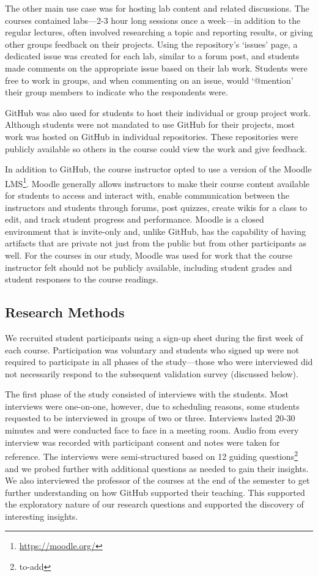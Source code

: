 The other main use case was for hosting lab content and related discussions. The courses contained labs---2-3 hour long sessions once a week---in addition to the regular lectures, often involved researching a topic and reporting results, or giving other groups feedback on their projects. Using the repository's `issues' page, a dedicated issue was created for each lab, similar to a forum post, and students made comments on the appropriate issue based on their lab work. Students were free to work in groups, and when commenting on an issue, would `@mention' their group members to indicate who the respondents were.

GitHub was also used for students to host their individual or group project work. Although students were not mandated to use GitHub for their projects, most work was hosted on GitHub in individual repositories. These repositories were publicly available so others in the course could view the work and give feedback.

In addition to GitHub, the course instructor opted to use a version of the Moodle LMS\footnote{\url{https://moodle.org/}}. Moodle generally allows instructors to make their course content available for students to access and interact with, enable communication between the instructors and students through forums, post quizzes, create wikis for a class to edit, and track student progress and performance. Moodle is a closed environment that is invite-only and, unlike GitHub, has the capability of having artifacts that are private not just from the public but from other participants as well. For the courses in our study, Moodle was used for work that the course instructor felt should not be publicly available, including student grades and student responses to the course readings.

\subsection{Research Methods}
We recruited student participants using a sign-up sheet during the first week of each course. Participation was voluntary and students who signed up were not required to participate in all phases of the study---those who were interviewed did not necessarily respond to the subsequent validation survey (discussed below).

The first phase of the study consisted of interviews with the students. Most interviews were one-on-one, however, due to scheduling reasons, some students requested to be interviewed in groups of two or three. Interviews lasted 20-30 minutes and were conducted face to face in a meeting room. Audio from every interview was recorded with participant consent and notes were taken for reference. The interviews were semi-structured based on 12 guiding questions\footnote{to-add} and we probed further with additional questions as needed to gain their insights. We also interviewed the professor of the courses at the end of the semester to get further understanding on how GitHub supported their teaching. This supported the exploratory nature of our research questions and supported the discovery of interesting insights.

